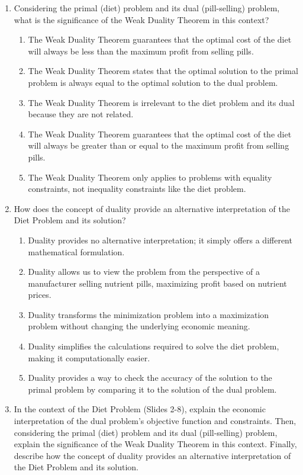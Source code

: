 \documentclass{article}%
\begin{document}
\begin{enumerate}
\begin{enumerate}
\end{enumerate}%
\vspace{1em}%
\item Considering the primal (diet) problem and its dual (pill-selling) problem, what is the significance of the Weak Duality Theorem in this context?%
\begin{enumerate}%
\item The Weak Duality Theorem guarantees that the optimal cost of the diet will always be less than the maximum profit from selling pills.%
\item The Weak Duality Theorem states that the optimal solution to the primal problem is always equal to the optimal solution to the dual problem.%
\item The Weak Duality Theorem is irrelevant to the diet problem and its dual because they are not related.%
\item The Weak Duality Theorem guarantees that the optimal cost of the diet will always be greater than or equal to the maximum profit from selling pills.%
\item The Weak Duality Theorem only applies to problems with equality constraints, not inequality constraints like the diet problem.%
\end{enumerate}%
\vspace{1em}%
\item How does the concept of duality provide an alternative interpretation of the Diet Problem and its solution?%
\begin{enumerate}%
\item Duality provides no alternative interpretation; it simply offers a different mathematical formulation.%
\item Duality allows us to view the problem from the perspective of a manufacturer selling nutrient pills, maximizing profit based on nutrient prices.%
\item Duality transforms the minimization problem into a maximization problem without changing the underlying economic meaning.%
\item Duality simplifies the calculations required to solve the diet problem, making it computationally easier.%
\item Duality provides a way to check the accuracy of the solution to the primal problem by comparing it to the solution of the dual problem.%
\end{enumerate}%
\vspace{1em}%
\item In the context of the Diet Problem (Slides 2-8), explain the economic interpretation of the dual problem's objective function and constraints.  Then, considering the primal (diet) problem and its dual (pill-selling) problem, explain the significance of the Weak Duality Theorem in this context. Finally, describe how the concept of duality provides an alternative interpretation of the Diet Problem and its solution.%

\end{enumerate}
\end{document}
